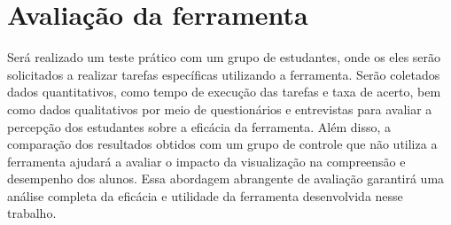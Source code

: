 
\section{Avaliação da ferramenta}
Será realizado um teste prático com um grupo de estudantes, onde os eles serão solicitados a realizar tarefas específicas utilizando a ferramenta. Serão coletados dados quantitativos, como tempo de execução das tarefas e taxa de acerto, bem como dados qualitativos por meio de questionários e entrevistas para avaliar a percepção dos estudantes sobre a eficácia da ferramenta. Além disso, a comparação dos resultados obtidos com um grupo de controle que não utiliza a ferramenta ajudará a avaliar o impacto da visualização na compreensão e desempenho dos alunos. Essa abordagem abrangente de avaliação garantirá uma análise completa da eficácia e utilidade da ferramenta desenvolvida nesse trabalho.

